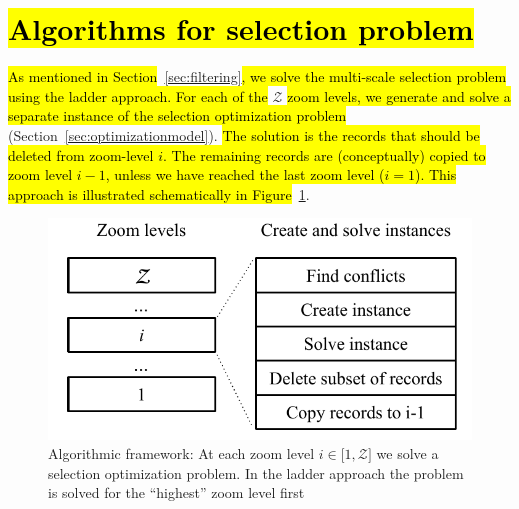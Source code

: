 \section{\hl{Algorithms for selection problem}}
\label{sec:algorithms}

\hl{As mentioned in Section}~\ref{sec:filtering}\hl{, we solve the multi-scale selection problem using the ladder approach. For each of the }$\mathcal{Z}$\hl{ zoom levels, we generate and solve a separate instance of the selection optimization problem }(Section~\ref{sec:optimizationmodel}). \hl{The solution is the records that should be deleted from zoom-level $i$. The remaining records are (conceptually) copied to zoom level $i-1$, unless we have reached the last zoom level ($i=1$). This approach is illustrated schematically in Figure}~\ref{fig:algorithmic-framework}.



\begin{figure}[htbp]
\begin{center}
\includegraphics[scale=.6]{figs/cvl_stages.pdf}
\caption{Algorithmic framework: At each zoom level $i \in \lbrack 1, \mathcal{Z} \rbrack$ we solve a selection optimization problem. In the ladder approach the problem is solved for the ``highest'' zoom level first}
\label{fig:algorithmic-framework}
\end{center}
\end{figure}

